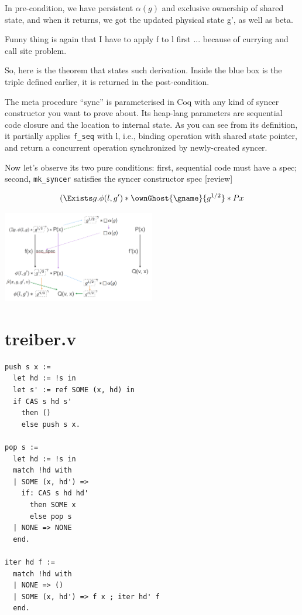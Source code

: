 \documentclass[11pt]{article}
\begin{document}
In pre-condition, we have persistent $\alpha(g)$ and exclusive ownership of shared state, and when it returns, we got the updated physical state g’, as well as beta.

Funny thing is again that I have to apply f to l first ... because of currying and call site problem.
  


So, here is the theorem that states such derivation. Inside the blue box is the triple defined earlier, it is returned in the post-condition.

The meta procedure “sync” is parameterised in Coq with any kind of syncer constructor you want to prove about. Its heap-lang parameters are sequential code closure and the location to internal state. As you can see from its definition, it partially applies \texttt{f\_seq} with l, i.e., binding operation with shared state pointer, and return a concurrent operation synchronized by newly-created syncer.

Now let’s observe its two pure conditions: first, sequential code must have a spec; second, \texttt{mk\_syncer} satisfies the syncer constructor spec [review]

\[ (\Exists g. \phi(l, g') * \ownGhost{\gname}{g^{1/2}} * P x \]

\includegraphics[width=0.5\textwidth]{atomic_sync}

\section{treiber.v}

\begin{verbatim}
push s x :=
  let hd := !s in
  let s' := ref SOME (x, hd) in
  if CAS s hd s'
    then ()
    else push s x.

pop s :=
  let hd := !s in
  match !hd with
  | SOME (x, hd') =>
    if: CAS s hd hd'
      then SOME x
      else pop s
  | NONE => NONE
  end.

iter hd f :=
  match !hd with
  | NONE => ()
  | SOME (x, hd') => f x ; iter hd' f
  end.

\end{verbatim}
\end{document}
